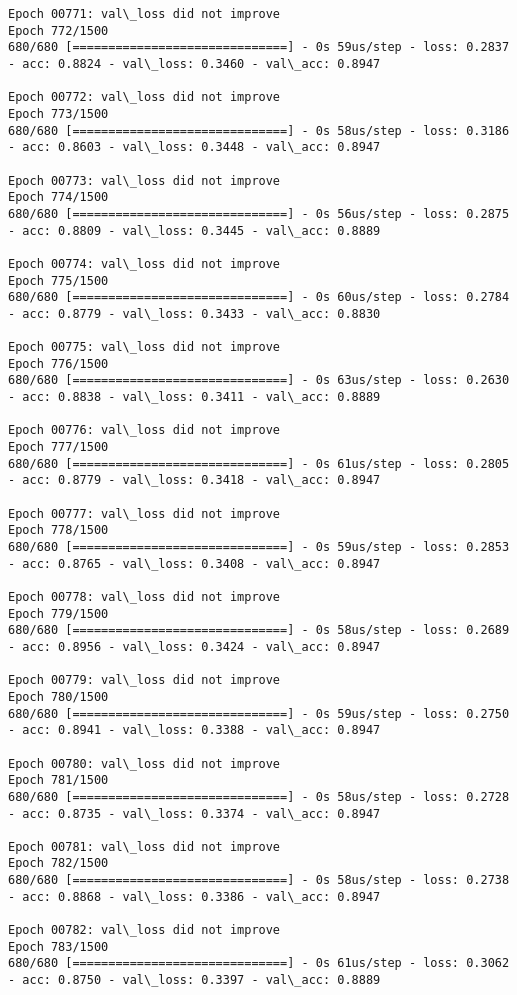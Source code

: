 \documentclass[11pt]{article}
\begin{document}
\begin{Verbatim}[commandchars=\\\{\}]
Epoch 00771: val\_loss did not improve
Epoch 772/1500
680/680 [==============================] - 0s 59us/step - loss: 0.2837 - acc: 0.8824 - val\_loss: 0.3460 - val\_acc: 0.8947

Epoch 00772: val\_loss did not improve
Epoch 773/1500
680/680 [==============================] - 0s 58us/step - loss: 0.3186 - acc: 0.8603 - val\_loss: 0.3448 - val\_acc: 0.8947

Epoch 00773: val\_loss did not improve
Epoch 774/1500
680/680 [==============================] - 0s 56us/step - loss: 0.2875 - acc: 0.8809 - val\_loss: 0.3445 - val\_acc: 0.8889

Epoch 00774: val\_loss did not improve
Epoch 775/1500
680/680 [==============================] - 0s 60us/step - loss: 0.2784 - acc: 0.8779 - val\_loss: 0.3433 - val\_acc: 0.8830

Epoch 00775: val\_loss did not improve
Epoch 776/1500
680/680 [==============================] - 0s 63us/step - loss: 0.2630 - acc: 0.8838 - val\_loss: 0.3411 - val\_acc: 0.8889

Epoch 00776: val\_loss did not improve
Epoch 777/1500
680/680 [==============================] - 0s 61us/step - loss: 0.2805 - acc: 0.8779 - val\_loss: 0.3418 - val\_acc: 0.8947

Epoch 00777: val\_loss did not improve
Epoch 778/1500
680/680 [==============================] - 0s 59us/step - loss: 0.2853 - acc: 0.8765 - val\_loss: 0.3408 - val\_acc: 0.8947

Epoch 00778: val\_loss did not improve
Epoch 779/1500
680/680 [==============================] - 0s 58us/step - loss: 0.2689 - acc: 0.8956 - val\_loss: 0.3424 - val\_acc: 0.8947

Epoch 00779: val\_loss did not improve
Epoch 780/1500
680/680 [==============================] - 0s 59us/step - loss: 0.2750 - acc: 0.8941 - val\_loss: 0.3388 - val\_acc: 0.8947

Epoch 00780: val\_loss did not improve
Epoch 781/1500
680/680 [==============================] - 0s 58us/step - loss: 0.2728 - acc: 0.8735 - val\_loss: 0.3374 - val\_acc: 0.8947

Epoch 00781: val\_loss did not improve
Epoch 782/1500
680/680 [==============================] - 0s 58us/step - loss: 0.2738 - acc: 0.8868 - val\_loss: 0.3386 - val\_acc: 0.8947

Epoch 00782: val\_loss did not improve
Epoch 783/1500
680/680 [==============================] - 0s 61us/step - loss: 0.3062 - acc: 0.8750 - val\_loss: 0.3397 - val\_acc: 0.8889


\end{Verbatim}
\end{document}
